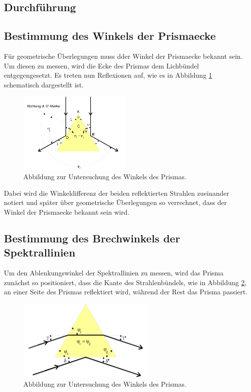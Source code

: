 \subsection{Durchführung}
\label{sec:durchführung}
\subsection{Bestimmung des Winkels der Prismaecke}

Für geometrische Überlegungen muss dder Winkel der Prismaecke bekannt sein.
Um diesen zu messen, wird die Ecke des Prismas dem Lichbündel entgegengesetzt.
Es treten nun Reflexionen auf, wie es in Abbildung \ref{fig:2} schematisch dargestellt ist.

\begin{figure}[H]
  \centering
  \includegraphics[height=4cm]{ressources/aufbau2.png}
  \caption{Abbildung zur Untersuchung des Winkels des Prismas. \cite{skript}}
  \label{fig:2}
\end{figure}

Dabei wird die Winkeldifferenz der beiden reflektierten Strahlen zueinander notiert und später über geometrische Überlegungen so verrechnet, dass der Winkel der Prismaecke bekannt sein wird.

\subsection{Bestimmung des Brechwinkels der Spektrallinien}

Um den Ablenkungswinkel der Spektrallinien zu messen, wird das Prisma zunächst so positioniert, dass die Kante des Strahlenbündels, wie in Abbildung \ref{fig:3}, an einer Seite des Prismas reflektiert wird, während der Rest das Prisma passiert.

\begin{figure}[H]
  \centering
  \includegraphics[height=4cm]{ressources/aufbau3.png}
  \caption{Abbildung zur Untersuchung des Winkels des Prismas. \cite{skript}}
  \label{fig:3}
\end{figure}

